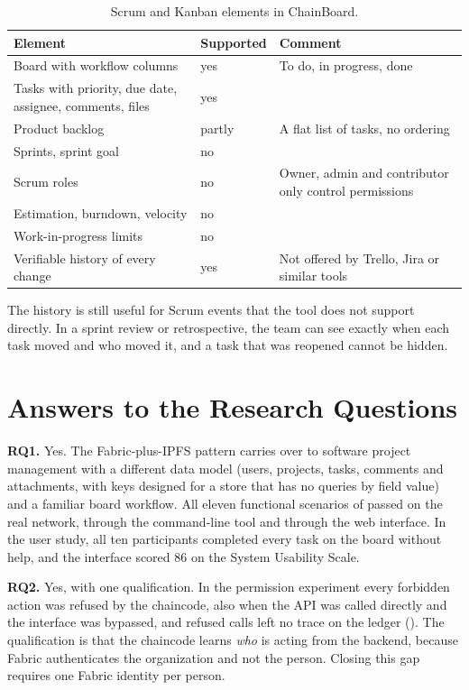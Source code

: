 \begin{table}[htbp]
    \centering
    \small
    \begin{tabular}{p{4.4cm}p{1.6cm}p{6.0cm}}
        \toprule
        Element & Supported & Comment \\
        \midrule
        Board with workflow columns & yes & To do, in progress, done \\
        Tasks with priority, due date, assignee, comments, files & yes & \\
        Product backlog & partly & A flat list of tasks, no ordering \\
        Sprints, sprint goal & no & \\
        Scrum roles & no & Owner, admin and contributor only control permissions \\
        Estimation, burndown, velocity & no & \\
        Work-in-progress limits & no & \\
        Verifiable history of every change & yes & Not offered by Trello, Jira or similar tools \\
        \bottomrule
    \end{tabular}
    \caption{Scrum and Kanban elements in ChainBoard.}
    \label{tab:agile}
\end{table}

The history is still useful for Scrum events that the tool does not support directly. In a sprint review or retrospective, the team can see exactly when each task moved and who moved it, and a task that was reopened cannot be hidden.

\section{Answers to the Research Questions}
\label{sec:rq-answers}

\textbf{RQ1.} Yes. The Fabric-plus-IPFS pattern carries over to software project management with a different data model (users, projects, tasks, comments and attachments, with keys designed for a store that has no queries by field value) and a familiar board workflow. All eleven functional scenarios of  passed on the real network, through the command-line tool and through the web interface. In the user study, all ten participants completed every task on the board without help, and the interface scored 86 on the System Usability Scale.

\textbf{RQ2.} Yes, with one qualification. In the permission experiment every forbidden action was refused by the chaincode, also when the API was called directly and the interface was bypassed, and refused calls left no trace on the ledger (). The qualification is that the chaincode learns \emph{who} is acting from the backend, because Fabric authenticates the organization and not the person. Closing this gap requires one Fabric identity per person.

